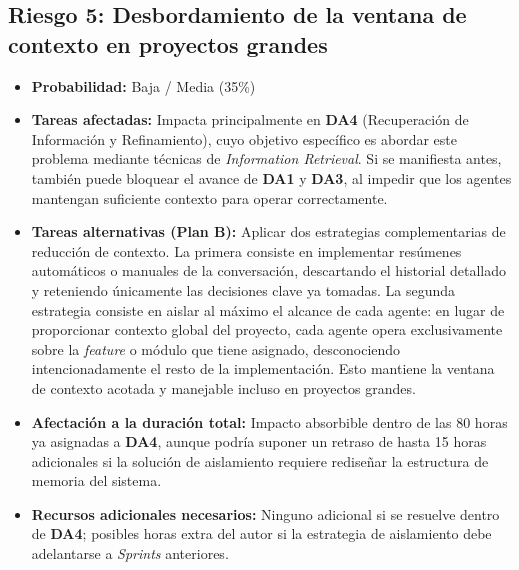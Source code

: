 \documentclass[11pt, letterpaper]{article}
\begin{document}
\subsection{Riesgo 5: Desbordamiento de la ventana de contexto en proyectos grandes}
\begin{itemize}
    \item \textbf{Probabilidad:} Baja / Media (35\%)
    \item \textbf{Tareas afectadas:} Impacta principalmente en \textbf{DA4} (Recuperación de Información y Refinamiento), cuyo objetivo específico es abordar este problema mediante técnicas de \textit{Information Retrieval}. Si se manifiesta antes, también puede bloquear el avance de \textbf{DA1} y \textbf{DA3}, al impedir que los agentes mantengan suficiente contexto para operar correctamente.
    \item \textbf{Tareas alternativas (Plan B):} Aplicar dos estrategias complementarias de reducción de contexto. La primera consiste en implementar resúmenes automáticos o manuales de la conversación, descartando el historial detallado y reteniendo únicamente las decisiones clave ya tomadas. La segunda estrategia consiste en aislar al máximo el alcance de cada agente: en lugar de proporcionar contexto global del proyecto, cada agente opera exclusivamente sobre la \textit{feature} o módulo que tiene asignado, desconociendo intencionadamente el resto de la implementación. Esto mantiene la ventana de contexto acotada y manejable incluso en proyectos grandes.
    \item \textbf{Afectación a la duración total:} Impacto absorbible dentro de las 80 horas ya asignadas a \textbf{DA4}, aunque podría suponer un retraso de hasta 15 horas adicionales si la solución de aislamiento requiere rediseñar la estructura de memoria del sistema.
    \item \textbf{Recursos adicionales necesarios:} Ninguno adicional si se resuelve dentro de \textbf{DA4}; posibles horas extra del autor si la estrategia de aislamiento debe adelantarse a \textit{Sprints} anteriores.
\end{itemize}
\end{document}
